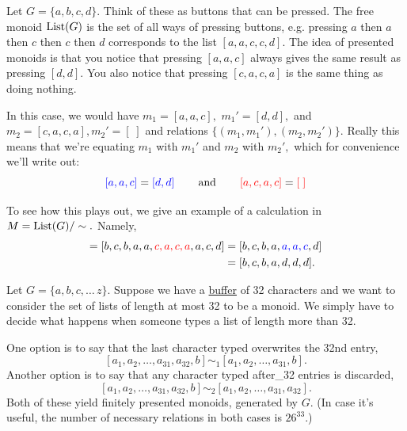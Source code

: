\documentclass[CT4S-EN-RU]{subfiles}
\begin{document}
\begin{remarkRUS}
\end{remarkRUS}

\begin{exampleENG}\label{ex:presented monoid}
Let $G=\{a,b,c,d\}.$ Think of these as buttons that can be pressed. The free monoid $\textnormal{List}(G)$ is the set of all ways of pressing buttons, e.g. pressing $a$ then $a$ then $c$ then $c$ then $d$ corresponds to the list $[a,a,c,c,d].$ The idea of presented monoids is that you notice that pressing $[a,a,c]$ always gives the same result as pressing $[d,d].$ You also notice that pressing $[c,a,c,a]$ is the same thing as doing nothing.

In this case, we would have $m_1=[a,a,c],$ $m_1'=[d,d],$ and $m_2=[c,a,c,a], m_2'=[\;]$ and relations $\{(m_1,m_1'), (m_2,m_2')\}.$ Really this means that we're equating $m_1$ with $m_1'$ and $m_2$ with $m_2',$ which for convenience we'll write out:
$${\color{blue}{[a,a,c]}}={\color{blue}{[d,d]}}\hspace{.3in}\textnormal{and}\hspace{.3in}{\color{red}{[a,c,a,c]}}={\color{red}{[\;]}}
$$

To see how this plays out, we give an example of a calculation in $M=\textnormal{List}(G)/\sim.$ Namely,
\begin{align*}
[b,c,b,{\color{blue}{d,d}},a,c,a,a,c,d] = [b,c,b,a,a,{\color{red}{c,a,c,a}},a,c,d] &= [b,c,b,a,{\color{blue}{a,a,c}},d]\\
&= [b,c,b,a,d,d,d].
\end{align*}
\end{exampleENG}

\begin{exampleRUS}\label{ex:presented monoid}
\end{exampleRUS}

\begin{applicationENG}[Buffer]\label{app:buffer}
Let $G=\{a,b,c,\ldots\,z\}.$ Suppose we have a \href{http://en.wikipedia.org/wiki/Data_buffer}{\text buffer} of 32 characters and we want to consider the set of lists of length at most 32 to be a monoid. We simply have to decide what happens when someone types a list of length more than 32.

One option is to say that the last character typed overwrites the 32nd entry, $$[a_1,a_2,\ldots,a_{31},a_{32},b]\sim_1[a_1,a_2,\ldots,a_{31},b].$$ Another option is to say that any character typed after\_32 entries is discarded, $$[a_1,a_2,\ldots,a_{31},a_{32},b]\sim_2[a_1,a_2,\ldots,a_{31},a_{32}].$$ Both of these yield finitely presented monoids, generated by $G.$ (In case it's useful, the number of necessary relations in both cases is $26^{33}.$)
\end{applicationENG}
\end{document}
